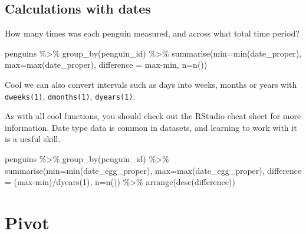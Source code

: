 \documentclass[
]{book}
\newenvironment{Shaded}{\begin{snugshade}}{\end{snugshade}}
\newcommand{\AttributeTok}[1]{\textcolor[rgb]{0.77,0.63,0.00}{#1}}
\newcommand{\DecValTok}[1]{\textcolor[rgb]{0.00,0.00,0.81}{#1}}
\newcommand{\FunctionTok}[1]{\textcolor[rgb]{0.00,0.00,0.00}{#1}}
\newcommand{\NormalTok}[1]{#1}
\newcommand{\SpecialCharTok}[1]{\textcolor[rgb]{0.00,0.00,0.00}{#1}}
\begin{document}
\hypertarget{calculations-with-dates}{%
\subsection{Calculations with dates}\label{calculations-with-dates}}

How many times was each penguin measured, and across what total time period?

\begin{Shaded}
\begin{Highlighting}[]
\NormalTok{penguins }\SpecialCharTok{\%\textgreater{}\%} 
  \FunctionTok{group\_by}\NormalTok{(penguin\_id) }\SpecialCharTok{\%\textgreater{}\%} 
  \FunctionTok{summarise}\NormalTok{(}\AttributeTok{min=}\FunctionTok{min}\NormalTok{(date\_proper), }
            \AttributeTok{max=}\FunctionTok{max}\NormalTok{(date\_proper), }
            \AttributeTok{difference =}\NormalTok{ max}\SpecialCharTok{{-}}\NormalTok{min, }
            \AttributeTok{n=}\FunctionTok{n}\NormalTok{())}
\end{Highlighting}
\end{Shaded}

Cool we can also convert intervals such as days into weeks, months or years with \texttt{dweeks(1)}, \texttt{dmonths(1)}, \texttt{dyears(1)}.

As with all cool functions, you should check out the RStudio cheat sheet for more information. Date type data is common in datasets, and learning to work with it is a uesful skill.

\begin{Shaded}
\begin{Highlighting}[]
\NormalTok{penguins }\SpecialCharTok{\%\textgreater{}\%} 
  \FunctionTok{group\_by}\NormalTok{(penguin\_id) }\SpecialCharTok{\%\textgreater{}\%} 
  \FunctionTok{summarise}\NormalTok{(}\AttributeTok{min=}\FunctionTok{min}\NormalTok{(date\_egg\_proper), }
            \AttributeTok{max=}\FunctionTok{max}\NormalTok{(date\_egg\_proper), }
            \AttributeTok{difference =}\NormalTok{ (max}\SpecialCharTok{{-}}\NormalTok{min)}\SpecialCharTok{/}\FunctionTok{dyears}\NormalTok{(}\DecValTok{1}\NormalTok{),}
            \AttributeTok{n=}\FunctionTok{n}\NormalTok{()) }\SpecialCharTok{\%\textgreater{}\%} 
  \FunctionTok{arrange}\NormalTok{(}\FunctionTok{desc}\NormalTok{(difference))}
\end{Highlighting}
\end{Shaded}

\hypertarget{pivot}{%
\section{Pivot}\label{pivot}}
\end{document}
